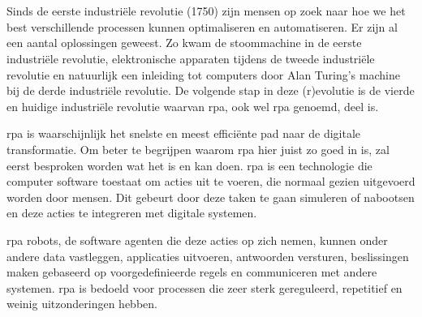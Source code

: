 
\chapter{}
\label{ch:inleiding}
Sinds de eerste industriële revolutie (1750) zijn mensen op zoek naar hoe we het best verschillende processen kunnen optimaliseren en automatiseren. Er zijn al een aantal oplossingen geweest. Zo kwam de stoommachine in de eerste industriële revolutie, elektronische apparaten tijdens de tweede industriële revolutie en natuurlijk een inleiding tot computers door Alan Turing's machine bij de derde industriële revolutie. De volgende stap in deze (r)evolutie is de vierde en huidige industriële revolutie waarvan \acrlong{rpa}, ook wel \acrshort{rpa} genoemd, deel is. \autocite{indusRev}

\acrshort{rpa} is waarschijnlijk het snelste en meest efficiënte pad naar de digitale transformatie. Om beter te begrijpen waarom \acrshort{rpa} hier juist zo goed in is, zal eerst besproken worden wat het is en kan doen. \acrshort{rpa} is een technologie die computer software toestaat om acties uit te voeren, die normaal gezien uitgevoerd worden door mensen. Dit gebeurt door deze taken te gaan simuleren of nabootsen en deze acties te integreren met digitale systemen.

\acrshort{rpa} robots, de software agenten die deze acties op zich nemen, kunnen onder andere data vastleggen, applicaties uitvoeren, antwoorden versturen, beslissingen maken gebaseerd op voorgedefinieerde regels en communiceren met andere systemen. \acrshort{rpa} is bedoeld voor processen die zeer sterk gereguleerd, repetitief en weinig uitzonderingen hebben.

